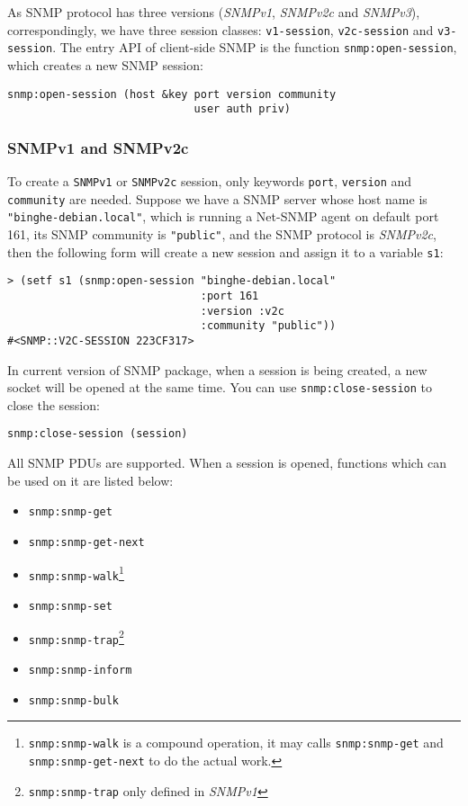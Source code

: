 \documentclass[reprint,natbib,9pt]{sigplanconf}
\begin{document}
As SNMP protocol has three versions (\textsl{SNMPv1}, \textsl{SNMPv2c}
and \textsl{SNMPv3}), correspondingly, we have three session classes:
\texttt{v1-session}, \texttt{v2c-session} and \texttt{v3-session}. The
entry API of client-side SNMP is the function
\texttt{snmp:open-session}, which creates a new SNMP session:
%
\begin{verbatim}
snmp:open-session (host &key port version community
                             user auth priv)
\end{verbatim}

\subsubsection{SNMPv1 and SNMPv2c}

To create a \texttt{SNMPv1} or \texttt{SNMPv2c} session, only keywords \texttt{port},
\texttt{version} and \texttt{community} are needed. Suppose we have a
SNMP server whose host name is \texttt{"binghe-debian.local"},
which is running a Net-SNMP agent on default port 161, its SNMP
community is \texttt{"public"}, and the SNMP protocol is
\textsl{SNMPv2c}, then the following form will create a new session
and assign it to a variable \texttt{s1}:
%
\begin{verbatim}
> (setf s1 (snmp:open-session "binghe-debian.local"
                              :port 161
                              :version :v2c
                              :community "public"))
#<SNMP::V2C-SESSION 223CF317>
\end{verbatim}

In current version of SNMP package, when a session is being created, a
new socket will be opened at the same time. You can use
\texttt{snmp:close-session} to close the session:
%
\begin{verbatim}
snmp:close-session (session)
\end{verbatim}

All SNMP PDUs \cite{RFC:3416} are supported. When a session is opened, functions which
can be used on it are listed below:

\begin{itemize}
\item \texttt{snmp:snmp-get}
\item \texttt{snmp:snmp-get-next}
\item \texttt{snmp:snmp-walk}\footnote{\texttt{snmp:snmp-walk} is a compound operation,
it may calls \texttt{snmp:snmp-get} and \texttt{snmp:snmp-get-next} to do
the actual work.}
\item \texttt{snmp:snmp-set}
\item \texttt{snmp:snmp-trap}\footnote{\texttt{snmp:snmp-trap} only defined in \textsl{SNMPv1}}
\item \texttt{snmp:snmp-inform}
\item \texttt{snmp:snmp-bulk}
\end{itemize}
\end{document}
